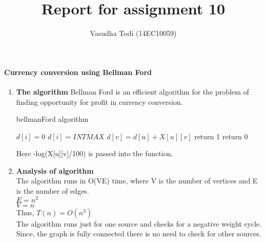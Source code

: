 \documentclass[a4paper,11pt]{article}
\title{Report for assignment 10}
\author{Vasudha Todi (14EC10059)}
\begin{document}
\maketitle

\paragraph{Currency conversion using Bellman Ford}
\begin{enumerate}
 \item \textbf{The algorithm}
Bellman Ford is an efficient algorithm for the problem of finding opportunity for profit in currency conversion.\\
  \begin{algorithm}
    \caption{bellmanFord algorithm}
    \begin{algorithmic}[1]
            \State $d[i] = 0$
        \Else
            \State $d[i] = INTMAX$
        \EndIf
    \EndFor
                    \State $d[v] = d[u] + X[u][v]$
                \EndIf
            \EndFor
        \EndFor
    \EndFor
                \State return 1
            \EndIf
        \EndFor
    \EndFor
    \State return 0
    \end{algorithmic}
  \end{algorithm}
Here -log(X[u][v]/100) is passed into the function.\\

\item \textbf{Analysis of algorithm}\\
The algorithm runs in O(VE) time, where V is the number of vertices and E is the number of edges.\\
$E = n^2$\\
$V = n$\\
Thus, $T(n) = O(n^3)$\\
The algorithm runs just for one source and checks for a negative weight cycle. Since, the graph is fully connected there is no need to check for other sources.\\

\end{enumerate}
\end{document}
